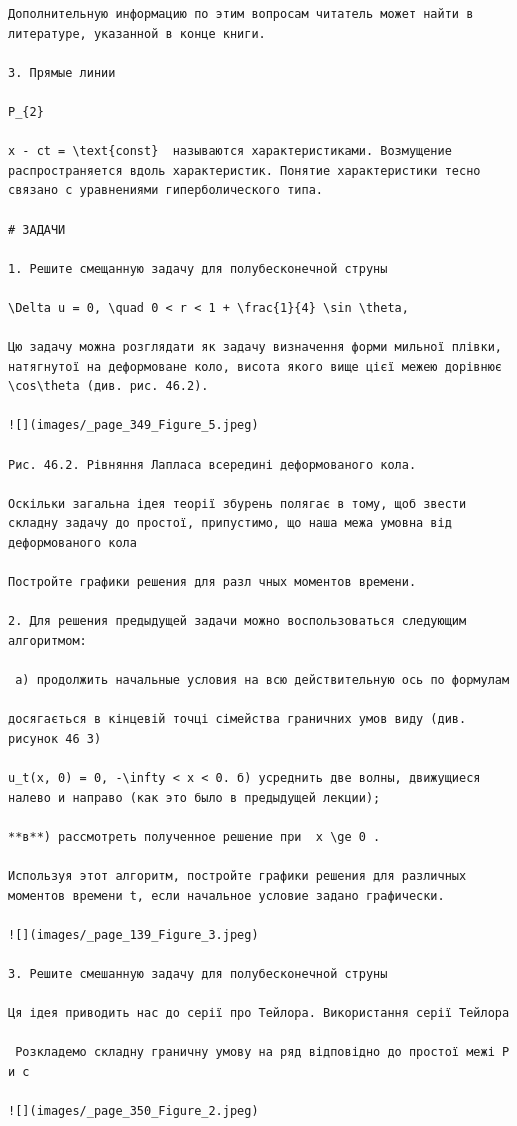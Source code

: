 \documentclass[
  ukrainian,
]{article}
\begin{document}
\begin{verbatim}
Дополнительную информацию по этим вопросам читатель может найти в литературе, указанной в конце книги.

3. Прямые линии

P_{2}

x - ct = \text{const}  называются характеристиками. Возмущение распространяется вдоль характеристик. Понятие характеристики тесно связано с уравнениями гиперболического типа.

# ЗАДАЧИ

1. Решите смещанную задачу для полубесконечной струны

\Delta u = 0, \quad 0 < r < 1 + \frac{1}{4} \sin \theta,

Цю задачу можна розглядати як задачу визначення форми мильної плівки, натягнутої на деформоване коло, висота якого вище цієї межею дорівнює \cos\theta (див. рис. 46.2).

![](images/_page_349_Figure_5.jpeg)

Рис. 46.2. Рівняння Лапласа всередині деформованого кола.

Оскільки загальна ідея теорії збурень полягає в тому, щоб звести складну задачу до простої, припустимо, що наша межа умовна від деформованого кола

Постройте графики решения для разл чных моментов времени.

2. Для решения предыдущей задачи можно воспользоваться следующим алгоритмом:

 а) продолжить начальные условия на всю действительную ось по формулам

досягається в кінцевій точці сімейства граничних умов виду (див. рисунок 46 3)

u_t(x, 0) = 0, -\infty < x < 0. б) усреднить две волны, движущиеся налево и направо (как это было в предыдущей лекции);

**в**) рассмотреть полученное решение при  x \ge 0 .

Используя этот алгоритм, постройте графики решения для различных моментов времени t, если начальное условие задано графически.

![](images/_page_139_Figure_3.jpeg)

3. Решите смешанную задачу для полубесконечной струны

Ця ідея приводить нас до серії про Тейлора. Використання серії Тейлора

 Розкладемо складну граничну умову на ряд відповідно до простої межі Р и с

![](images/_page_350_Figure_2.jpeg)


\end{verbatim}
\end{document}
